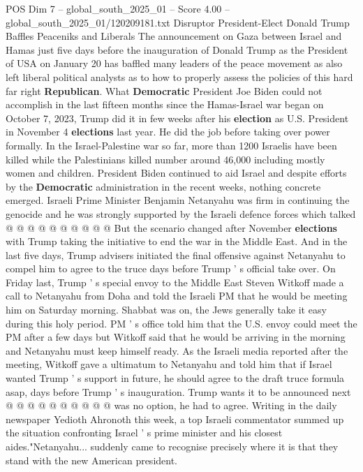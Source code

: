 \begin{textsample}{POS Dim 7 – global\_south\_2025\_01 – Score 4.00 – global\_south\_2025\_01/120209181.txt}  \label{ex:f7_pos_346}
Disruptor President-Elect Donald Trump Baffles Peaceniks and Liberals The announcement on Gaza between Israel and Hamas just five days before the inauguration of Donald Trump as the President of USA on January 20 has baffled many leaders of the peace movement as also left liberal political analysts as to how to properly assess the policies of this hard far right \textbf{Republican}.
What \textbf{Democratic} President Joe Biden could not accomplish in the last fifteen months since the Hamas-Israel war began on October 7, 2023, Trump did it in few weeks after his \textbf{election} as U.S.
President in November 4 \textbf{elections} last year.
He did the job before taking over power formally.
In the Israel-Palestine war so far, more than 1200 Israelis have been killed while the Palestinians killed number around 46,000 including mostly women and children.
President Biden continued to aid Israel and despite efforts by the \textbf{Democratic} administration in the recent weeks, nothing concrete emerged.
Israeli Prime Minister Benjamin Netanyahu was firm in continuing the genocide and he was strongly supported by the Israeli defence forces which talked @ @ @ @ @ @ @ @ @ @ But the scenario changed after November \textbf{elections} with Trump taking the initiative to end the war in the Middle East.
And in the last five days, Trump advisers initiated the final offensive against Netanyahu to compel him to agree to the truce days before Trump ' s official take over.
On Friday last, Trump ' s special envoy to the Middle East Steven Witkoff made a call to Netanyahu from Doha and told the Israeli PM that he would be meeting him on Saturday morning.
Shabbat was on, the Jews generally take it easy during this holy period.
PM ' s office told him that the U.S. envoy could meet the PM after a few days but Witkoff said that he would be arriving in the morning and Netanyahu must keep himself ready.
As the Israeli media reported after the meeting, Witkoff gave a ultimatum to Netanyahu and told him that if Israel wanted Trump ' s support in future, he should agree to the draft truce formula asap, days before Trump ' s inauguration.
Trump wants it to be announced next @ @ @ @ @ @ @ @ @ @ was no option, he had to agree.
Writing in the daily newspaper Yedioth Ahronoth this week, a top Israeli commentator summed up the situation confronting Israel ' s prime minister and his closest aides."Netanyahu... suddenly came to recognise precisely where it is that they stand with the new American president.

\end{textsample}
